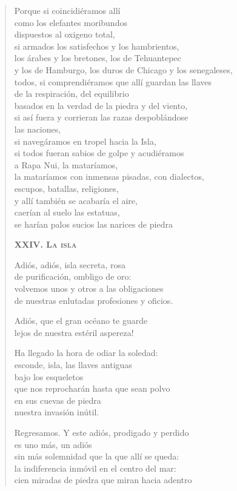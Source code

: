 \documentclass[12pt]{article}
\begin{document}
\begin{verse}
Porque si coincidiéramos allí\\
como los elefantes moribundos\\
dispuestos al oxigeno total,\\
si armados los satisfechos y los hambrientos,\\
los árabes y los bretones, los de Tehuantepec\\
y los de Hamburgo, los duros de Chicago y los senegaleses,\\
todos, si comprendiéramos que allí guardan las llaves\\
de la respiración, del equilibrio\\
basados en la verdad de la piedra y del viento,\\
si así fuera y corrieran las razas despoblándose\\
las naciones,\\
si navegáramos en tropel hacia la Isla,\\
si todos fueran sabios de golpe y acudiéramos\\
a Rapa Nui, la mataríamos,\\
la mataríamos con inmensas pisadas, con dialectos,\\
escupos, batallas, religiones,\\
y allí también se acabaría el aire,\\
caerían al suelo las estatuas,\\
se harían palos sucios las narices de piedra  

{\bfseries\scshape {XXIV. La isla}}

Adiós, adiós, isla secreta, rosa\\
de purificación, ombligo de oro:\\
volvemos unos y otros a las obligaciones\\
de nuestras enlutadas profesiones y oficios.  

Adiós, que el gran océano te guarde\\
lejos de nuestra estéril aspereza!  

Ha llegado la hora de odiar la soledad:\\
esconde, isla, las llaves antiguas\\
bajo los esqueletos\\
que nos reprocharán hasta que sean polvo\\
en sus cuevas de piedra\\
nuestra invasión inútil.  

Regresamos. Y este adiós, prodigado y perdido\\
es uno más, un adiós\\
sin más solemnidad que la que allí se queda:\\
la indiferencia inmóvil en el centro del mar:\\
cien miradas de piedra que miran hacia adentro  

\end{verse}
\end{document}

